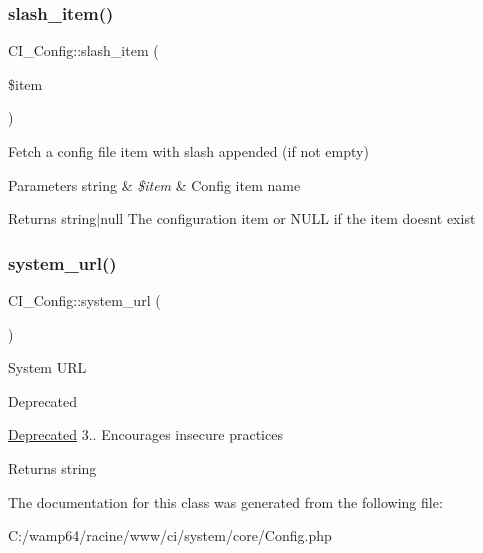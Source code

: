\subsubsection{\texorpdfstring{slash\+\_\+item()}{slash\_item()}}
{\footnotesize\ttfamily C\+I\+\_\+\+Config\+::slash\+\_\+item (\begin{DoxyParamCaption}\item[{}]{\$item }\end{DoxyParamCaption})}

Fetch a config file item with slash appended (if not empty)


\begin{DoxyParams}[1]{Parameters}
string & {\em \$item} & Config item name \\
\hline
\end{DoxyParams}
\begin{DoxyReturn}{Returns}
string$\vert$null The configuration item or N\+U\+LL if the item doesn\textquotesingle{}t exist 
\end{DoxyReturn}
\mbox{\label{class_c_i___config_ad3ca14c7961f9a42d494e3317d90edef}} 
\subsubsection{\texorpdfstring{system\+\_\+url()}{system\_url()}}
{\footnotesize\ttfamily C\+I\+\_\+\+Config\+::system\+\_\+url (\begin{DoxyParamCaption}{ }\end{DoxyParamCaption})}

System U\+RL

\begin{DoxyRefDesc}{Deprecated}
\item[\mbox{\hyperlink{deprecated__deprecated000001}{Deprecated}}]3.. Encourages insecure practices \end{DoxyRefDesc}
\begin{DoxyReturn}{Returns}
string 
\end{DoxyReturn}


The documentation for this class was generated from the following file\+:\begin{DoxyCompactItemize}
\item 
C\+:/wamp64/racine/www/ci/system/core/Config.\+php\end{DoxyCompactItemize}
